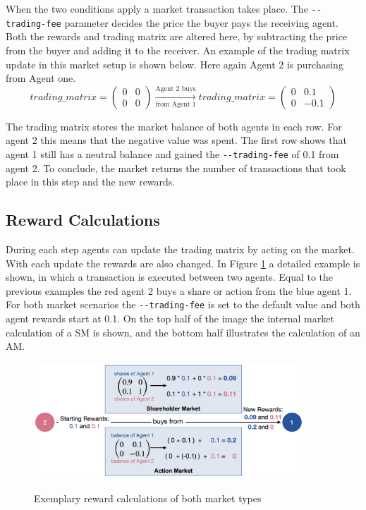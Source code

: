 When the two conditions apply a market transaction takes place. The \verb|--trading-fee| parameter decides the price the buyer pays the receiving agent. Both the rewards and trading matrix are altered here, by subtracting the price from the buyer and adding it to the receiver. An example of the trading matrix update in this market setup is shown below. Here again Agent 2 is purchasing from Agent one.
\begin{equation*}
trading\_matrix = 
\begin{pmatrix}
0 & 0 \\
0 & 0
\end{pmatrix} \xrightarrow[\text{from Agent 1}]{\text{Agent 2 buys}} 
trading\_matrix = 
\begin{pmatrix}
0 & 0.1 \\
0 & -0.1
\end{pmatrix} 
\end{equation*}

The trading matrix stores the market balance of both agents in each row. For agent 2 this means that the negative value was spent. The first row shows that agent 1 still has a neutral balance and gained the \verb|--trading-fee| of 0.1 from agent 2. To conclude, the market returns the number of transactions that took place in this step and the new rewards.

\subsection{Reward Calculations}\label{market_reward_calc}
During each step agents can update the trading matrix by acting on the market. With each update the rewards are also changed. In Figure \ref{fig:market_rewards} a detailed example is shown, in which a transaction is executed between two agents. Equal to the previous examples the red agent 2 buys a share or action from the blue agent 1. For both market scenarios the \verb|--trading-fee| is set to the default value and both agent rewards start at 0.1. On the top half of the image the internal market calculation of a SM is shown, and the bottom half illustrates the calculation of an AM.
\begin{figure}[hpbt]
    \centering
    \includegraphics[width=0.9\textwidth]{pictures/new_market_rewards}\\
    \caption[Exemplary Reward Calculation Of Markets]{Exemplary reward calculations of both market types}\label{fig:market_rewards}
\end{figure}

